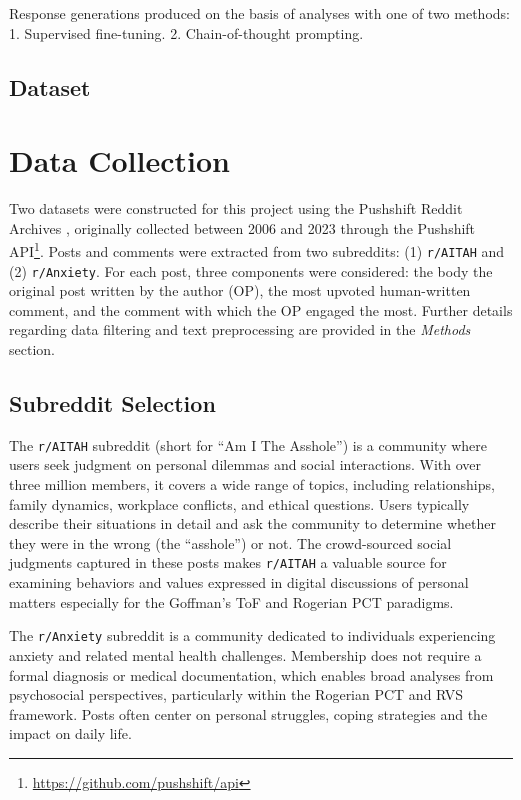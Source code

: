 \textcolor{black!60}{Response generations produced on the basis of analyses with one of two methods: 1. Supervised fine-tuning.
2. Chain-of-thought prompting.}
\textcolor{black!30}{\lipsum[9-10]}

\subsection{Dataset}
\section{Data Collection}

Two datasets were constructed for this project using the Pushshift Reddit Archives \cite{pushshift}, originally collected between 2006 and 2023 through the Pushshift API\footnote{\url{https://github.com/pushshift/api}}. Posts and comments were extracted from two subreddits: (1) \texttt{r/AITAH} and (2) \texttt{r/Anxiety}. For each post, three components were considered: the body the original post written by the author (OP), the most upvoted human-written comment, and the comment with which the OP engaged the most. Further details regarding data filtering and text preprocessing are provided in the \emph{Methods} section.  

\subsection{Subreddit Selection}

The \texttt{r/AITAH} subreddit (short for ``Am I The Asshole'') is a community where users seek judgment on personal dilemmas and social interactions. With over three million members, it covers a wide range of topics, including relationships, family dynamics, workplace conflicts, and ethical questions. Users typically describe their situations in detail and ask the community to determine whether they were in the wrong (the ``asshole'') or not. The crowd-sourced social judgments captured in these posts makes \texttt{r/AITAH} a valuable source for examining behaviors and values expressed in digital discussions of personal matters especially for the Goffman's ToF and Rogerian PCT paradigms.  

The \texttt{r/Anxiety} subreddit is a community dedicated to individuals experiencing anxiety and related mental health challenges. Membership does not require a formal diagnosis or medical documentation, which enables broad analyses from psychosocial perspectives, particularly within the Rogerian PCT and RVS framework. Posts often center on personal struggles, coping strategies and the impact on daily life.

